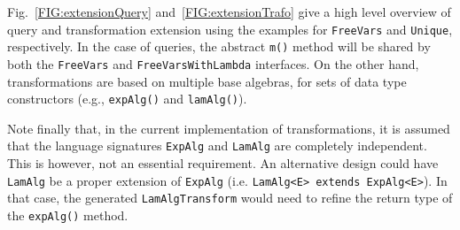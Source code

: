 Fig.~\ref{FIG:extensionQuery} and~\ref{FIG:extensionTrafo} give a high level overview of query and transformation extension using the examples for \lstinline{FreeVars} and \lstinline{Unique}, respectively.
In the case of queries, the abstract \lstinline{m()} method will be shared by both the \lstinline{FreeVars} and \lstinline{FreeVarsWithLambda} interfaces.
On the other hand, transformations are based on multiple base algebras, for sets of data type constructors (e.g., \lstinline{expAlg()} and \lstinline{lamAlg()}).

Note finally that, in the current implementation of \name transformations, it is assumed that the language signatures \lstinline{ExpAlg} and \lstinline{LamAlg} are completely independent.
This is however, not an essential requirement.
An alternative design could have \lstinline{LamAlg} be a proper extension of \lstinline{ExpAlg} (i.e. \lstinline{LamAlg<E> extends ExpAlg<E>}).
In that case, the generated \lstinline{LamAlgTransform} would need to refine the return type of the \lstinline{expAlg()} method.


